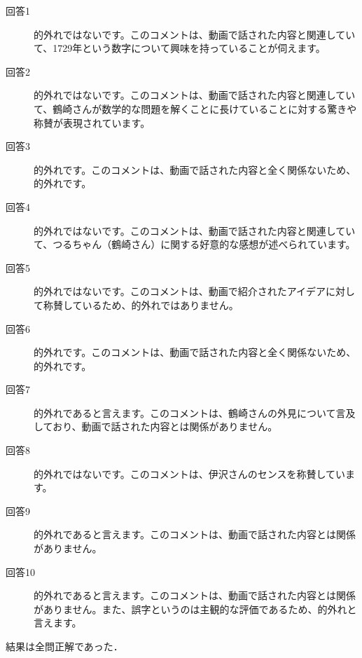 \documentclass[platex,dvipdfmx,a4paper,twocolumn,base=10.5pt,jbase=10.5pt,ja=standard]{bxjsarticle}
\begin{document}
\begin{description}
   \item[回答1]的外れではないです。このコメントは、動画で話された内容と関連していて、1729年という数字について興味を持っていることが伺えます。
   \item[回答2]的外れではないです。このコメントは、動画で話された内容と関連していて、鶴崎さんが数学的な問題を解くことに長けていることに対する驚きや称賛が表現されています。
   \item[回答3]的外れです。このコメントは、動画で話された内容と全く関係ないため、的外れです。
   \item[回答4]的外れではないです。このコメントは、動画で話された内容と関連していて、つるちゃん（鶴崎さん）に関する好意的な感想が述べられています。
   \item[回答5]的外れではないです。このコメントは、動画で紹介されたアイデアに対して称賛しているため、的外れではありません。
   \item[回答6]的外れです。このコメントは、動画で話された内容と全く関係ないため、的外れです。
   \item[回答7]的外れであると言えます。このコメントは、鶴崎さんの外見について言及しており、動画で話された内容とは関係がありません。
   \item[回答8]的外れではないです。このコメントは、伊沢さんのセンスを称賛しています。
   \item[回答9]的外れであると言えます。このコメントは、動画で話された内容とは関係がありません。
   \item[回答10]的外れであると言えます。このコメントは、動画で話された内容とは関係がありません。また、誤字というのは主観的な評価であるため、的外れと言えます。 
\end{description}
結果は全問正解であった．
\end{document}
